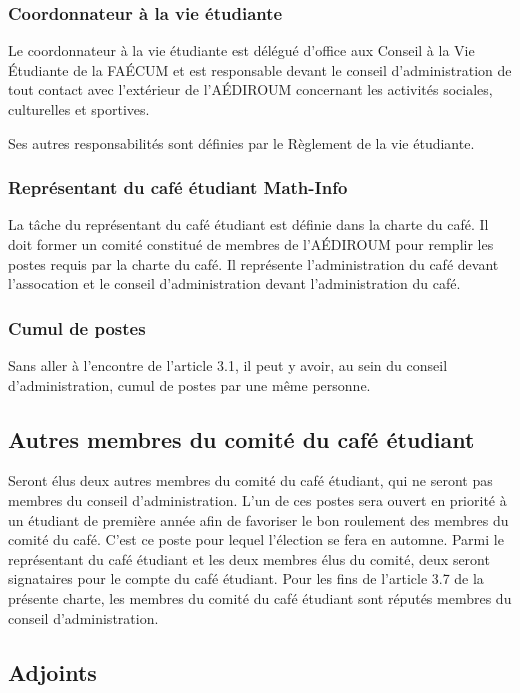 \documentclass[12pt]{article}
\begin{document}
\subsubsection{Coordonnateur à la vie étudiante}

 Le coordonnateur à la vie étudiante est délégué d'office aux Conseil à la Vie Étudiante de la FAÉCUM et est responsable devant le conseil d'administration de tout contact avec l'extérieur de l'AÉDIROUM concernant les activités sociales, culturelles et sportives.


Ses autres responsabilités sont définies par le Règlement de la vie étudiante.


\subsubsection{Représentant du café étudiant Math-Info}

La tâche du représentant du café étudiant est définie dans la charte du café. Il doit former un comité constitué de membres de l'AÉDIROUM pour remplir les postes requis par la charte du café. Il représente l'administration du café devant l'assocation et le conseil d'administration devant l'administration du café.

\subsubsection{Cumul de postes}

Sans aller à l'encontre de l'article 3.1, il peut y avoir, au sein du conseil d'administration, cumul de postes par une même personne.

\subsection{Autres membres du comité du café étudiant}

Seront élus deux autres membres du comité du café étudiant, qui ne seront pas membres du conseil d'administration. L'un de ces postes sera ouvert en priorité à un étudiant de première année afin de favoriser le bon roulement des membres du comité du café. C'est ce poste pour lequel l'élection se fera en automne. Parmi le représentant du café étudiant et les deux membres élus du comité, deux seront signataires pour le compte du café étudiant. Pour les fins de l'article 3.7 de la présente charte, les membres du comité du café étudiant sont réputés membres du conseil d'administration.

\subsection{Adjoints}
\end{document}
